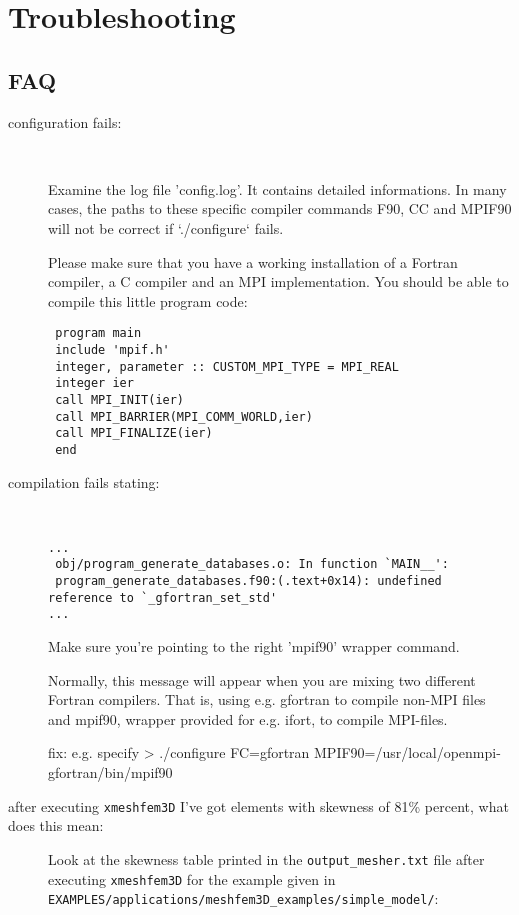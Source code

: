 \chapter{Troubleshooting}\label{cha:Troubleshooting}


\section*{FAQ}
\begin{description}
\item [{configuration fails:}]~


Examine the log file 'config.log'. It contains detailed informations.
In many cases, the paths to these specific compiler commands F90,
CC and MPIF90 will not be correct if `./configure` fails.\newline


Please make sure that you have a working installation of a Fortran
compiler, a C compiler and an MPI implementation. You should be able
to compile this little program code:

{\footnotesize
\begin{verbatim}
 program main
 include 'mpif.h'
 integer, parameter :: CUSTOM_MPI_TYPE = MPI_REAL
 integer ier
 call MPI_INIT(ier)
 call MPI_BARRIER(MPI_COMM_WORLD,ier)
 call MPI_FINALIZE(ier)
 end
\end{verbatim}
}

\item [{compilation fails stating:}] ~
{\footnotesize
\begin{verbatim}
...
 obj/program_generate_databases.o: In function `MAIN__':
 program_generate_databases.f90:(.text+0x14): undefined reference to `_gfortran_set_std'
...
\end{verbatim}
}

Make sure you're pointing to the right 'mpif90' wrapper command.\newline


Normally, this message will appear when you are mixing two different
Fortran compilers. That is, using e.g. gfortran to compile non-MPI
files and mpif90, wrapper provided for e.g. ifort, to compile MPI-files.\newline


fix: e.g. specify > ./configure FC=gfortran MPIF90=/usr/local/openmpi-gfortran/bin/mpif90

\item [{after executing \texttt{xmeshfem3D} I've got elements with skewness of 81\% percent, what does this mean:}] Look
at the skewness table printed in the \texttt{output\_mesher.txt} file
after executing \texttt{xmeshfem3D} for the example given in \texttt{EXAMPLES/applications/meshfem3D\_examples/simple\_model/}:


\end{description}
